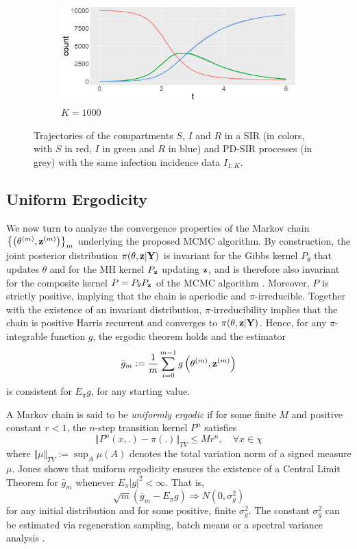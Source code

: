 \documentclass[11pt]{article}
\begin{document}
\begin{figure}
\begin{subfigure}[b]{0.49\textwidth}
			\centering
			\includegraphics[width=\textwidth]{E2_K1000}
			\caption{$K = 1000$}
			\label{fig:comparison_RD_SIR_K1000}
		\end{subfigure}
		\caption{Trajectories of the compartments $S$, $I$ and $R$ in a SIR (in colors, with $S$ in red, $I$ in green and $R$ in blue) and PD-SIR processes (in grey) with the same infection incidence data $I_{1:K}$.}
		\label{fig:comparison}
	\end{figure}
	\smallskip
	
	\subsection{Uniform Ergodicity}
	\label{sec:uni}
	We now turn to analyze the convergence properties of the Markov chain $\left\{\left(\theta^{(m)}, \mathbf{z}^{(m)}\right)\right\}_m$ underlying the proposed MCMC algorithm. By construction, the joint posterior distribution $\pi(\theta, \mathbf{z}|\mathbf{Y})$ is invariant for the Gibbs kernel $P_\theta$ that updates $\theta$ and for the MH kernel $P_{\mathbf{z}}$ updating $\mathbf{z}$, and is therefore also invariant for the composite kernel $P=P_\theta P_{\mathbf{z}}$ of the MCMC algorithm \cite{Tierney.1994}. Moreover, $P$ is strictly positive, implying that the chain is aperiodic and $\pi$-irreducible. Together with the existence of an invariant distribution, $\pi$-irreducibility implies that the chain is positive Harris recurrent and converges to $\pi(\theta, \mathbf{z}|\mathbf{Y})$. Hence, for any $\pi$-integrable function $g$, the ergodic theorem holds and the estimator
	$$\bar{g}_m := \frac{1}{m} \sum_{i=0}^{m-1} g\left(\theta^{(m)}, \mathbf{z}^{(m)}\right)$$
	is consistent for $E_\pi g$, for any starting value. 
	
	A Markov chain is said to be \textit{uniformly ergodic} if for some finite $M$ and positive constant $r<1$, the $n$-step transition kernel $P^n$ satisfies
	$$
	\Vert P^n(x,.)-\pi(.)\Vert_{TV} \le M r^n, \quad \forall x \in \chi
	$$
	where $\Vert \mu \Vert_{TV} := \sup_A \mu(A)$ denotes the total variation norm of a signed measure $\mu$.
	Jones \cite{Jones.2004b} shows that uniform ergodicity ensures the existence of a Central Limit Theorem for $\bar{g}_m$ whenever $E_\pi |g|^2 < \infty$. That is,
	$$\sqrt{m}(\bar{g}_m - E_\pi g) \Rightarrow N(0, \sigma^2_g)$$
	for any initial distribution and for some positive, finite $\sigma^2_g$. The constant $\sigma^2_g$ can be estimated via regeneration sampling, batch means or a spectral variance analysis \cite{Flegal.2010}.
	
\end{document}
